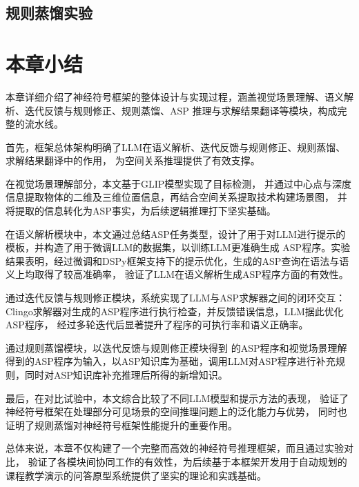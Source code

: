 \subsection{规则蒸馏实验}

\section{本章小结}
本章详细介绍了神经符号框架的整体设计与实现过程，涵盖视觉场景理解、语义解析、迭代反馈与规则修正、规则蒸馏、ASP 推理与求解结果翻译等模块，构成完整的流水线。

首先，框架总体架构明确了LLM在语义解析、迭代反馈与规则修正、规则蒸馏、求解结果翻译中的作用，
为空间关系推理提供了有效支撑。

在视觉场景理解部分，本文基于GLIP模型实现了目标检测，
并通过中心点与深度信息提取物体的二维及三维位置信息，再结合空间关系提取技术构建场景图，
并将提取的信息转化为ASP事实，为后续逻辑推理打下坚实基础。

在语义解析模块中，本文通过总结ASP任务类型，设计了用于对LLM进行提示的模板，并构造了用于微调LLM的数据集，以训练LLM更准确生成
ASP程序。实验结果表明，经过微调和DSPy框架支持下的提示优化，生成的ASP查询在语法与语义上均取得了较高准确率，
验证了LLM在语义解析生成ASP程序方面的有效性。

通过迭代反馈与规则修正模块，系统实现了LLM与ASP求解器之间的闭环交互：
Clingo求解器对生成的ASP程序进行执行检查，并反馈错误信息，LLM据此优化ASP程序，
经过多轮迭代后显著提升了程序的可执行率和语义正确率。

通过规则蒸馏模块，以迭代反馈与规则修正模块得到
的ASP程序和视觉场景理解得到的ASP程序为输入，以ASP知识库为基础，调用LLM对ASP程序进行补充规则，同时对ASP知识库补充推理后所得的新增知识。

最后，在对比试验中，本文综合比较了不同LLM模型和提示方法的表现，
验证了神经符号框架在处理部分可见场景的空间推理问题上的泛化能力与优势，
同时也证明了规则蒸馏对神经符号框架性能提升的重要作用。

总体来说，本章不仅构建了一个完整而高效的神经符号推理框架，而且通过实验对比，
验证了各模块间协同工作的有效性，为后续基于本框架开发用于自动规划的课程教学演示的问答原型系统提供了坚实的理论和实践基础。